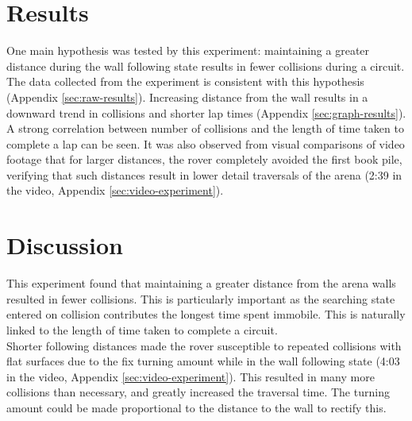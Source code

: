 \documentclass[a4paper,12pt,twocolumn]{article}
\begin{document}
\section{Results}
One main hypothesis was tested by this experiment: maintaining a greater distance during the wall following state results in fewer collisions during a circuit.
The data collected from the experiment is consistent with this hypothesis (Appendix \ref{sec:raw-results}). Increasing distance from the wall results in a downward trend in collisions and shorter lap times (Appendix \ref{sec:graph-results}). A strong correlation between number of collisions and the length of time taken to complete a lap can be seen. It was also observed from visual comparisons of video footage that for larger distances, the rover completely avoided the first book pile, verifying that such distances result in lower detail traversals of the arena (2:39 in the video, Appendix \ref{sec:video-experiment}). 

\section{Discussion}
This experiment found that maintaining a greater distance from the arena walls resulted in fewer collisions. This is particularly important as the searching state entered on collision contributes the longest time spent immobile. This is naturally linked to the length of time taken to complete a circuit.\\

Shorter following distances made the rover susceptible to repeated collisions with flat surfaces due to the fix turning amount while in the wall following state (4:03 in the video, Appendix \ref{sec:video-experiment}). This resulted in many more collisions than necessary, and greatly increased the traversal time. The turning amount could be made proportional to the distance to the wall to rectify this.
\end{document}
